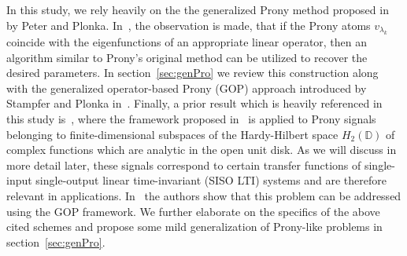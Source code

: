 \documentclass{arxiv}
\begin{document}
In this study, we rely heavily on the the generalized Prony method proposed in~\cite{peter2013generalized} by Peter and Plonka. In~\cite{peter2013generalized}, the observation is made, that if the Prony atoms $v_{\lambda_k}$ coincide with the eigenfunctions of an appropriate linear operator, then an algorithm similar to Prony's original method can be utilized to recover the desired parameters. In section~\ref{sec:genPro} we review this construction along with the generalized operator-based Prony (GOP) approach introduced by Stampfer and Plonka in~\cite{stampfer2020generalized}. 
Finally, a prior result which is heavily referenced in this study is~\cite{dozsa2025system}, where the framework proposed in~\cite{peter2013generalized} is applied to Prony signals belonging to finite-dimensional subspaces of the Hardy-Hilbert space $H_2(\mathbb{D})$ of complex functions which are analytic in the open unit disk. As we will discuss in more detail later, these signals correspond to certain transfer functions of single-input single-output linear time-invariant (SISO LTI) systems and are therefore relevant in applications. 
In~\cite{dozsa2025system} the authors show that this problem can be addressed using the GOP framework. We further elaborate on the specifics of the above cited schemes and propose some mild generalization of Prony-like problems in section~\ref{sec:genPro}.
\end{document}
